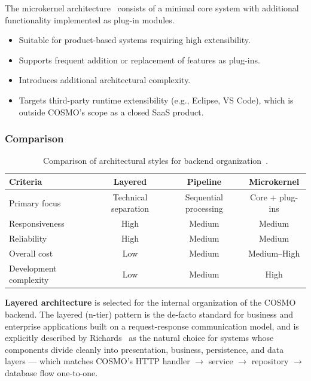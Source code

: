 \documentclass[a4paper]{article}
\begin{document}
The microkernel architecture~\cite{richards2020fundamentals} 
consists of a minimal core system with additional functionality 
implemented as plug-in modules.

\begin{itemize}
    \item Suitable for product-based systems requiring high 
    extensibility.
    \item Supports frequent addition or replacement of features as 
    plug-ins.
    \item Introduces additional architectural complexity.
    \item Targets third-party runtime extensibility (e.g., Eclipse, VS Code),
      which is outside COSMO's scope as a closed SaaS product.
\end{itemize}

\subsubsection{Comparison}

\begin{table}[H]
\centering
\caption{Comparison of architectural styles for backend 
organization~\cite{richards2020fundamentals}.}
\begin{tabular}{|l|c|c|c|}
\hline
\textbf{Criteria} & \textbf{Layered} & \textbf{Pipeline} & 
\textbf{Microkernel} \\
\hline
Primary focus & Technical separation & Sequential processing & 
Core + plug-ins \\
\hline
Responsiveness & High & Medium & Medium \\
\hline
Reliability & High & Medium & Medium \\
\hline
Overall cost & Low & Medium & Medium--High \\
\hline
Development complexity & Low & Medium & High \\
\hline
\end{tabular}
\end{table}

\textbf{Layered architecture} is selected for the internal organization
of the COSMO backend. The layered (n-tier) pattern is the de-facto
standard for business and enterprise applications built on a
request-response communication model, and is explicitly described by
Richards~\cite{richards_patterns} as the natural choice for systems
whose components divide cleanly into presentation, business, persistence,
and data layers — which matches COSMO's HTTP handler $\rightarrow$
service $\rightarrow$ repository $\rightarrow$ database flow one-to-one.
\end{document}
